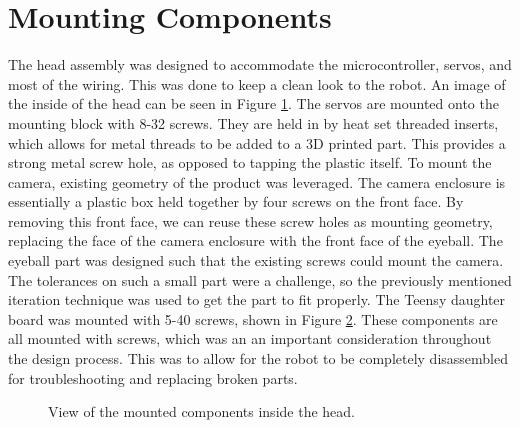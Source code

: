 \section{Mounting Components}
The head assembly was designed to accommodate the microcontroller, servos, and most of the wiring. This was done to keep a clean look to the robot. An image of the inside of the head can be seen in Figure \ref{fig:servo-shot}. The servos are mounted onto the mounting block with 8-32 screws. They are held in by heat set threaded inserts, which allows for metal threads to be added to a 3D printed part. This provides a strong metal screw hole, as opposed to tapping the plastic itself. To mount the camera, existing geometry of the product was leveraged. The camera enclosure is essentially a plastic box held together by four screws on the front face. By removing this front face, we can reuse these screw holes as mounting geometry, replacing the face of the camera enclosure with the front face of the eyeball. The eyeball part was designed such that the existing screws could mount the camera. The tolerances on such a small part were a challenge, so the previously mentioned iteration technique was used to get the part to fit properly. The Teensy daughter board was mounted with 5-40 screws, shown in Figure \ref{fig:teensy-shot}. These components are all mounted with screws, which was an an important consideration throughout the design process. This was to allow for the robot to be completely disassembled for troubleshooting and replacing broken parts.

\begin{figure}
    \centering
    \begin{subfigure}{0.4\linewidth}
        \caption{}
        \label{fig:servo-shot}
    \end{subfigure}
    \begin{subfigure}{0.4\linewidth}
        \caption{}
        \label{fig:teensy-shot}
    \end{subfigure}
    \caption{View of the mounted components inside the head.}
    \label{fig:mounted}
\end{figure}

